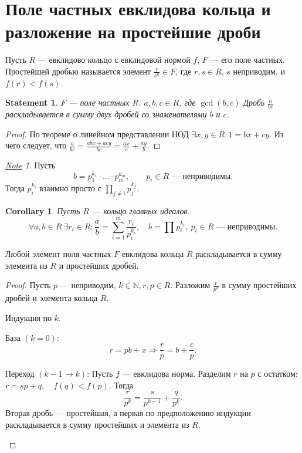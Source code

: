 \documentclass[11pt]{book}
\newcommand{\N}{\mathbb{N}}
\theoremstyle{definition}
\theoremstyle{plain}
\theoremstyle{plain}
\newtheorem{st}{Statement}
\newtheorem{cor}{Corollary}
\theoremstyle{definition}
\theoremstyle{remark}
\newtheorem*{note}{\underline{Note}}
\begin{document}
\section{Поле частных евклидова кольца и разложение на простейшие дроби}
\begin{defn}
    Пусть $ R$ ---  евклидово кольцо с евклидовой нормой $ f$, $ F$ --- его поле частных. {\sf Простейшей дробью} называется элемент $ \frac{r}{s^{n}} \in F$, где $ r, s \in R$, $ s$ неприводим, и  $ f(r) < f(s)$.
\end{defn}
 \begin{st}
     $ F$ --- поле частных $ R$. $ a, b, c \in  R$, где $ \gcd(b, c)$
    Дробь $ \frac{a}{bc}$ раскладывается в сумму двух дробей со знаменателями $ b$ и  $ c$.
 \end{st}
 \begin{proof}
     По теореме о линейном представлении НОД $ \exists x, y \in R: 1 = bx + cy$.
     Из чего следует, что $ \frac{a}{bc} = \frac{abx + acy}{bc} = \frac{ax}{c} + \frac{ay}{b}$. 
 \end{proof}
 \begin{note}
     Пусть
     \[
     b = p_1^{k_1} \cdot  \ldots  \cdot  p_m ^{k_m}, \qquad  p_i \in R \text{ --- неприводимы}
     .\] 
     Тогда
     $ p_i^{k_i} $ взаимно просто с $ \prod_{j \ne i} p_j ^{k_j}$.
 \end{note}
 \begin{cor}
     Пусть $ R$ --- кольцо главных идеалов.
     \[
	 \forall a, b \in  R ~ \exists  r_i \in  R: \frac{a}{b} = \sum_{i=1}^{m} \frac{r_i}{p_i^{k_i}}, \quad b = \prod p_i^{k_i}, ~ p_i \in R \text{ --- неприводимы}
     .\] 
 \end{cor}
 \begin{thm}
     Любой элемент поля частных $ F$ евклидова кольца $ R$ раскладывается в сумму элемента из $ R$ и простейших дробей. 
 \end{thm}
 \begin{proof}
     Пусть $ p $ --- неприводим, $ k \in  \N, r, p \in  R $. Разложим $ \frac{r}{p^{k}}$ в сумму простейших дробей и элемента кольца $ R$.

     Индукция по $ k$.
     \begin{description}
	 \item База $ (k = 0)$:
      \[
     r = pb + x \Longrightarrow \frac{r}{p } = b + \frac{c}{p}
     .\] 
	 \item 
	     Переход $ (k -1 \to  k)$:
     Пусть $ f$ --- евклидова норма. Разделим  $ r$ на  $ p$ с остатком:
     $ r = sp + q, \quad f(q) < f(p)$.
     Тогда 
\[
\frac{r}{p^{k}} = \frac{s}{p^{k-1}} + \frac{q}{p^{k}}
.\] 
Вторая дробь --- простейшая, а первая по предположению индукции раскладывается в сумму простейших и элемента из $ R$.
     \end{description}
 \end{proof}
\end{document}
